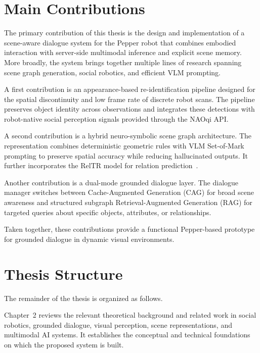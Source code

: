 \section{Main Contributions}

The primary contribution of this thesis is the design and implementation of a scene-aware dialogue system for the Pepper robot that combines embodied interaction with server-side multimodal inference and explicit scene memory. More broadly, the system brings together multiple lines of research spanning scene graph generation, social robotics, and efficient VLM prompting.

A first contribution is an appearance-based re-identification pipeline designed for the spatial discontinuity and low frame rate of discrete robot scans. The pipeline preserves object identity across observations and integrates these detections with robot-native social perception signals provided through the NAOqi API\@.

A second contribution is a hybrid neuro-symbolic scene graph architecture. The representation combines deterministic geometric rules with VLM Set-of-Mark prompting to preserve spatial accuracy while reducing hallucinated outputs. It further incorporates the RelTR model for relation prediction~\cite{cong_reltr_2023}.

Another contribution is a dual-mode grounded dialogue layer. The dialogue manager switches between Cache-Augmented Generation (CAG) for broad scene awareness and structured subgraph Retrieval-Augmented Generation (RAG) for targeted queries about specific objects, attributes, or relationships.


Taken together, these contributions provide a functional Pepper-based prototype for grounded dialogue in dynamic visual environments.

\section{Thesis Structure}

The remainder of the thesis is organized as follows.

Chapter~2 reviews the relevant theoretical background and related work in social robotics, grounded dialogue, visual perception, scene representations, and multimodal AI systems. It establishes the conceptual and technical foundations on which the proposed system is built.

